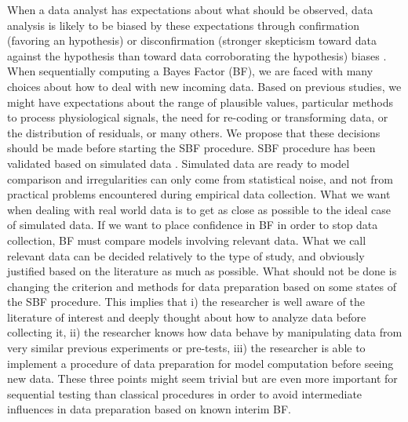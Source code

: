 \documentclass[a4paper,man,natbib,floatsintext,donotrepeattitle]{apa6}
\begin{document}
When a data analyst has expectations about what should be observed, data analysis is likely to be biased by these expectations through confirmation (favoring an hypothesis) or disconfirmation (stronger skepticism toward data against the hypothesis than toward data corroborating the hypothesis) biases \citep{lilienfeld_blind_2017}.
When sequentially computing a Bayes Factor (BF), we are faced with many choices about how to deal with new incoming data. Based on previous studies, we might have expectations about the range of plausible values, particular methods to process physiological signals, the need for re-coding or transforming data, or the distribution of residuals, or many others. We propose that these decisions should be made before starting the SBF procedure. SBF procedure has been validated based on simulated data \citep{schonbrodt_sequential_2017}. Simulated data are ready to model comparison and irregularities can only come from statistical noise, and not from practical problems encountered during empirical data collection. What we want when dealing with real world data is to get as close as possible to the ideal case of simulated data. If we want to place confidence in BF in order to stop data collection, BF must compare models involving relevant data. What we call relevant data can be decided relatively to the type of study, and obviously justified based on the literature as much as possible. What should not be done is changing the criterion and methods for data preparation based on some states of the SBF procedure. This implies that i) the researcher is well aware of the literature of interest and deeply thought about how to analyze data before collecting it, ii) the researcher knows how data behave by manipulating data from very similar previous experiments or pre-tests, iii) the researcher is able to implement a procedure of data preparation for model computation before seeing new data. These three points might seem trivial but are even more important for sequential testing than classical procedures in order to avoid intermediate influences in data preparation based on known interim BF.
\end{document}
